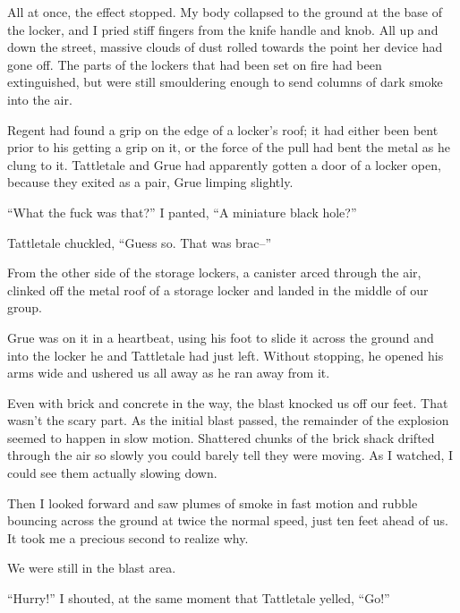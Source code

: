 All at once, the effect stopped.  My body collapsed to the ground at the base of the locker, and I pried stiff fingers from the knife handle and knob.  All up and down the street, massive clouds of dust rolled towards the point her device had gone off.  The parts of the lockers that had been set on fire had been extinguished, but were still smouldering enough to send columns of dark smoke into the air.



Regent had found a grip on the edge of a locker's roof; it had either been bent prior to his getting a grip on it, or the force of the pull had bent the metal as he clung to it.  Tattletale and Grue had apparently gotten a door of a locker open, because they exited as a pair, Grue limping slightly.



``What the fuck was that?'' I panted, ``A miniature black hole?''



Tattletale chuckled, ``Guess so.  That was brac--''



From the other side of the storage lockers, a canister arced through the air, clinked off the metal roof of a storage locker and landed in the middle of our group.



Grue was on it in a heartbeat, using his foot to slide it across the ground and into the locker he and Tattletale had just left.  Without stopping, he opened his arms wide and ushered us all away as he ran away from it.



Even with brick and concrete in the way, the blast knocked us off our feet.  That wasn't the scary part.  As the initial blast passed, the remainder of the explosion seemed to happen in slow motion.  Shattered chunks of the brick shack drifted through the air so slowly you could barely tell they were moving.  As I watched, I could see them actually slowing down.



Then I looked forward and saw plumes of smoke in fast motion and rubble bouncing across the ground at twice the normal speed, just ten feet ahead of us.  It took me a precious second  to realize why.



We were still in the blast area.



``Hurry!'' I shouted, at the same moment that Tattletale yelled, ``Go!''



